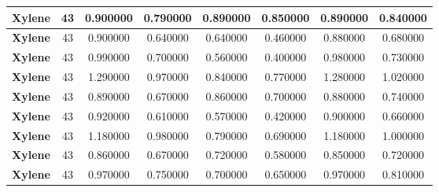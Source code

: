 \documentclass{amsart}
\begin{document}
\begin{center}
\begin{tabular}{c|c|c|c|c|c|c|c}
\textbf{Xylene}& 43&0.900000&0.790000&0.890000&0.850000&0.890000&0.840000 \\ \hline 
\textbf{Xylene}& 43&0.900000&0.640000&0.640000&0.460000&0.880000&0.680000 \\ \hline 
\textbf{Xylene}& 43&0.990000&0.700000&0.560000&0.400000&0.980000&0.730000 \\ \hline 
\textbf{Xylene}& 43&1.290000&0.970000&0.840000&0.770000&1.280000&1.020000 \\ \hline 
\textbf{Xylene}& 43&0.890000&0.670000&0.860000&0.700000&0.880000&0.740000 \\ \hline 
\textbf{Xylene}& 43&0.920000&0.610000&0.570000&0.420000&0.900000&0.660000 \\ \hline 
\textbf{Xylene}& 43&1.180000&0.980000&0.790000&0.690000&1.180000&1.000000 \\ \hline 
\textbf{Xylene}& 43&0.860000&0.670000&0.720000&0.580000&0.850000&0.720000 \\ \hline 
\textbf{Xylene}& 43&0.970000&0.750000&0.700000&0.650000&0.970000&0.810000 \\ \hline 
\end{tabular} 
\end{center} 
\end{document}
